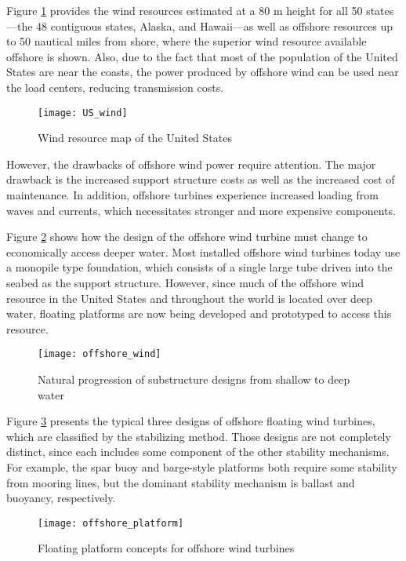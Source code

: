 \documentclass{umthesis}
\begin{document}
Figure \ref{fig:US_wind} provides the wind resources estimated at a 80 m height for all 50 states—the 48 contiguous states, Alaska, and Hawaii—as well as offshore resources up to 50 nautical miles from shore, where the superior wind resource available offshore is shown. Also, due to the fact that most of the population of the United States are near the coasts, the power produced by offshore wind can be used near the load centers, reducing transmission costs. 

\begin{figure}
  \centering
  \texttt{[image: US\_wind]}
  \caption{Wind resource map of the United States \cite{Schwartz}}\label{fig:US_wind}
\end{figure}

However, the drawbacks of offshore wind power require attention. The major drawback is the increased support structure costs as well as the increased cost of maintenance. In addition, offshore turbines experience increased loading from waves and currents, which necessitates stronger and more expensive components.

Figure \ref{fig:offshore_wind} shows how the design of the offshore wind turbine must change to economically access deeper water. Most installed offshore wind turbines today use a monopile type foundation, which consists of a single large tube driven into the seabed as the support structure. However, since much of the offshore wind resource in the United States and throughout the world is located over deep water, floating platforms are now being developed and prototyped to access this resource.

\begin{figure}
  \centering
  \texttt{[image: offshore\_wind]}
  \caption{Natural progression of substructure designs from shallow to deep water \cite{Jonkman}}\label{fig:offshore_wind}
\end{figure}

Figure \ref{fig:offshore_platform} presents the typical three designs of offshore floating wind turbines, which are classified by the stabilizing method. Those designs are not completely distinct, since each includes some component of the other stability mechanisms. For example, the spar buoy and barge-style platforms both require some stability from mooring lines, but the dominant stability mechanism is ballast and buoyancy, respectively.  

\begin{figure}
  \centering
  \texttt{[image: offshore\_platform]}
  \caption{Floating platform concepts for offshore wind turbines  \cite{Jonkman}}\label{fig:offshore_platform}
\end{figure}
\end{document}
